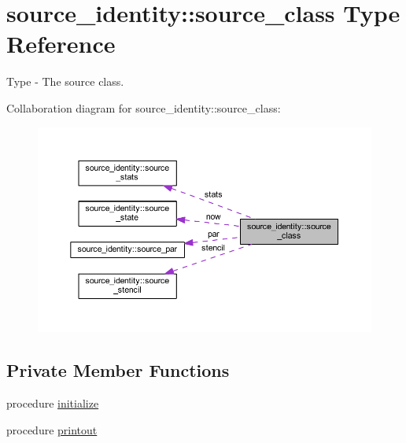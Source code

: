\hypertarget{structsource__identity_1_1source__class}{}\section{source\+\_\+identity\+:\+:source\+\_\+class Type Reference}
\label{structsource__identity_1_1source__class}


Type -\/ The source class.  




Collaboration diagram for source\+\_\+identity\+:\+:source\+\_\+class\+:\nopagebreak
\begin{figure}[H]
\begin{center}
\leavevmode
\includegraphics[width=350pt]{structsource__identity_1_1source__class__coll__graph}
\end{center}
\end{figure}
\subsection*{Private Member Functions}
\begin{DoxyCompactItemize}
\item 
procedure \mbox{\hyperlink{structsource__identity_1_1source__class_af232e5b647bcb16f34dcc2f797ef7a95}{initialize}}
\item 
procedure \mbox{\hyperlink{structsource__identity_1_1source__class_ac9866a62bf8838665bb929deff5bce24}{printout}}
\end{DoxyCompactItemize}
